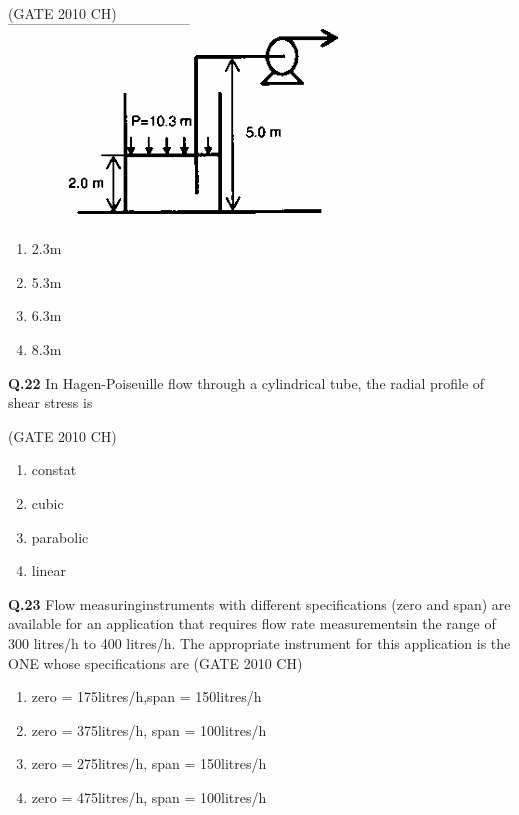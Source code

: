 \documentclass[journal,12pt,onecolumn]{exam}
\theoremstyle{remark}
\begin{document}
   \hfill{(GATE 2010 CH)}\\
  \includegraphics[width=0.5\linewidth]{images/Q.21 image.png}
      
 
  \begin{enumerate}
      \item 2.3m
      \item 5.3m
      \item 6.3m
      \item 8.3m
      
  \end{enumerate}


\noindent
\textbf{Q.22}
 In Hagen-Poiseuille flow through a cylindrical tube, the radial profile of shear stress is
 
 \hfill{(GATE 2010 CH)}\\

\begin{enumerate}
    \item constat
    \item cubic
    \item parabolic
    \item linear
    
\end{enumerate}

\noindent
\textbf{Q.23}
  Flow measuringinstruments with different specifications (zero and span) are available for an application that requires flow rate measurementsin the range of 300 litres/h to 400 litres/h. The appropriate instrument for this application is the ONE whose specifications are
  \hfill{(GATE 2010 CH)}\\

  \begin{enumerate}
      \item zero = 175litres/h,span = 150litres/h
      \item zero = 375litres/h, span = 100litres/h
      \item zero = 275litres/h, span = 150litres/h
      \item zero = 475litres/h, span = 100litres/h
  \end{enumerate}
\end{document}
